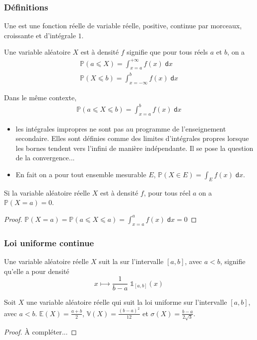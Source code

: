 \subsubsection{Définitions}
\begin{definition}
Une  est une fonction réelle de variable réelle, positive, continue par morceaux, croissante et
d'intégrale \(1\).
\end{definition}
\begin{definition}
Une variable aléatoire \(𝑋\) est à densité \(𝑓\) signifie que  pour tous réels \(𝑎\) et \(𝑏\), on a
\begin{gather*}
\displaystyle
ℙ(𝑎⩽𝑋)=\int _{𝑥=𝑎}^{+∞}𝑓(𝑥)\;𝖽𝑥
\\
ℙ(𝑋⩽𝑏)=\int _{𝑥=-∞}^{𝑏}𝑓(𝑥)\;𝖽𝑥
\end{gather*}
\end{definition}
%
\begin{corollary}
Dans le même contexte,
\begin{gather*}
ℙ(𝑎⩽𝑋⩽𝑏)=∫_{𝑥=𝑎}^{𝑏}𝑓(𝑥)\;𝖽𝑥
\end{gather*}
\end{corollary}
\begin{remark}
\vspace{-\baselineskip}
\begin{itemize}
\item
les intégrales impropres ne sont pas au programme de l'enseignement secondaire. Elles sont définies comme des limites
d'intégrales propres lorsque les bornes tendent vers l'infini de manière indépendante. Il se pose la question de la
convergence...
\item
En fait on a pour tout ensemble mesurable \(𝐸\),
\(ℙ(𝑋∈𝐸)=\int _{𝐸}𝑓(𝑥)\;𝖽𝑥\).
\end{itemize}
\end{remark}
%
\begin{proposition}
Si la variable aléatoire réelle \(𝑋\) est à densité \(𝑓\), pour tous réel \(𝑎\) on a
\(ℙ(𝑋=𝑎)=0\).
\end{proposition}
\begin{proof}
\(ℙ(𝑋=𝑎)=ℙ(𝑎⩽𝑋⩽𝑎)=\int _{𝑥=𝑎}^{𝑎}𝑓(𝑥)\;𝖽𝑥=0\)
\end{proof}
\subsubsection{Loi uniforme continue}
\begin{definition}
Une variable aléatoire réelle \(𝑋\) suit la  sur l'intervalle
\([𝑎,𝑏]\), avec \(𝑎<𝑏\), signifie qu'elle a pour densité
\begin{equation*}
𝑥⟼\frac 1{𝑏-𝑎}\;𝟙_{[𝑎,𝑏]}(𝑥)
\end{equation*}
\end{definition}
\begin{theorem}
Soit \(𝑋\) une variable aléatoire réelle qui suit la loi uniforme sur l'intervalle \([𝑎,𝑏]\), avec
\(𝑎<𝑏\).
\(𝔼(X)=\frac{𝑎+𝑏} 2\), \(𝕍(X)=\frac{(𝑏-𝑎)^2}{12}\) et
\(σ(X)=\frac{𝑏-𝑎}{2\sqrt 3}\).
\end{theorem}
\begin{proof}
À compléter...
\end{proof}
